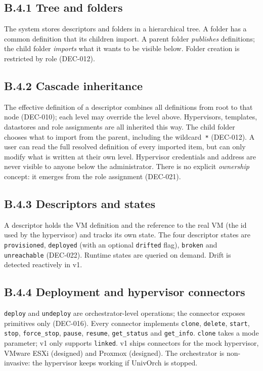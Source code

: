 \subsection*{B.4.1 Tree and folders}
The system stores descriptors and folders in a hierarchical tree.
A folder has a common definition that its children import.
A parent folder \emph{publishes} definitions; the child folder
\emph{imports} what it wants to be visible below.
Folder creation is restricted by role (DEC-012).

\subsection*{B.4.2 Cascade inheritance}
The effective definition of a descriptor combines all definitions
from root to that node (DEC-010); each level may override the level
above. Hypervisors, templates, datastores and role assignments are
all inherited this way. The child folder chooses what to import
from the parent, including the wildcard~\texttt{*} (DEC-012). A
user can read the full resolved definition of every imported item,
but can only modify what is written at their own level.
Hypervisor credentials and address are never visible to anyone
below the administrator. There is no explicit \emph{ownership}
concept: it emerges from the role assignment (DEC-021).

\subsection*{B.4.3 Descriptors and states}
A descriptor holds the VM definition and the reference to the real
VM (the id used by the hypervisor) and tracks its own state. The
four descriptor states are \texttt{provisioned}, \texttt{deployed}
(with an optional \texttt{drifted} flag), \texttt{broken} and
\texttt{unreachable} (DEC-022). Runtime states are queried on
demand. Drift is detected reactively in v1.

\subsection*{B.4.4 Deployment and hypervisor connectors}
\texttt{deploy} and \texttt{undeploy} are orchestrator-level
operations; the connector exposes primitives only (DEC-016). Every
connector implements \texttt{clone}, \texttt{delete}, \texttt{start},
\texttt{stop}, \texttt{force\_stop}, \texttt{pause}, \texttt{resume},
\texttt{get\_status} and \texttt{get\_info}. \texttt{clone} takes a
mode parameter; v1 only supports \texttt{linked}. v1 ships
connectors for the mock hypervisor, VMware ESXi (designed) and
Proxmox (designed). The orchestrator is non-invasive: the
hypervisor keeps working if UnivOrch is stopped.

